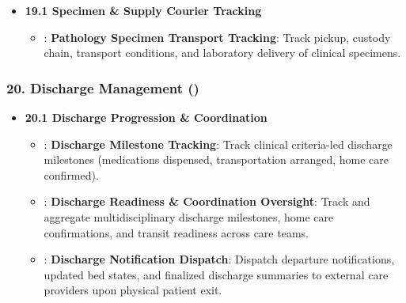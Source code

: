 \begin{itemize}

\item
\textbf{19.1 Specimen \& Supply Courier Tracking}


\begin{itemize}

\item
\texttt{}: \textbf{Pathology Specimen Transport Tracking}: Track pickup, custody chain, transport conditions, and laboratory delivery of clinical specimens.



\end{itemize}


\end{itemize}
\label{rad:enabling:552}
\subsubsection*{20. Discharge Management (\texttt{})}
\label{rad:enabling:553}

\begin{itemize}

\item
\textbf{20.1 Discharge Progression \& Coordination}


\begin{itemize}

\item
\texttt{}: \textbf{Discharge Milestone Tracking}: Track clinical criteria-led discharge milestones (medications dispensed, transportation arranged, home care confirmed).



\item
\texttt{}: \textbf{Discharge Readiness \& Coordination Oversight}: Track and aggregate multidisciplinary discharge milestones, home care confirmations, and transit readiness across care teams.



\item
\texttt{}: \textbf{Discharge Notification Dispatch}: Dispatch departure notifications, updated bed states, and finalized discharge summaries to external care providers upon physical patient exit.



\end{itemize}


\end{itemize}
\label{rad:enabling:558}

